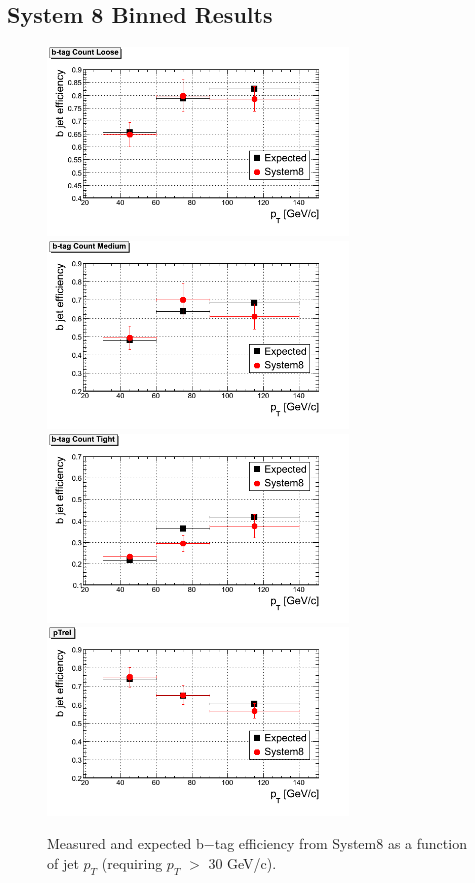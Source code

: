\subsection{System 8 Binned Results}
\begin{figure}[htbp]
  \begin{center}
    \includegraphics[width=80mm]{Figures/TCL_Tag.png}
    \includegraphics[width=80mm]{Figures/TCM_Tag.png}
    \includegraphics[width=80mm]{Figures/TCT_Tag.png}
    \includegraphics[width=80mm]{Figures/pTrel.png}
  \end{center}
  \caption{Measured and expected b$-$tag efficiency from System8 as a function of jet $p_T $ (requiring $p_T $ $> $ 30 GeV/c).}
  \label{fig:S8_TC_results}
\end{figure}


